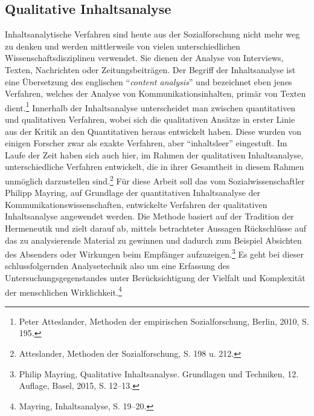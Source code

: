 \documentclass[
    a4paper,
    12pt,
    hyphens,
    chapterprefix=true,
    headheight=33pt,
    footheight=29pt,
    headings=optiontohead,
]{scrartcl}
\begin{document}
\subsection{Qualitative Inhaltsanalyse}
Inhaltsanalytische Verfahren sind heute aus der Sozialforschung nicht mehr weg zu denken und werden mittlerweile von vielen unterschiedlichen Wissenschaftsdisziplinen verwendet. Sie dienen der Analyse von Interviews, Texten, Nachrichten oder Zeitungsbeiträgen. Der Begriff der Inhaltsanalyse ist eine Übersetzung des englischen "`\textit{content analysis}"' und bezeichnet eben jenes Verfahren, welches der Analyse von Kommunikationsinhalten, primär von Texten dient.\footnote{Peter Atteslander, Methoden der empirischen Sozialforschung, Berlin, 2010, S. 195.} Innerhalb der Inhaltsanalyse unterscheidet man zwischen quantitativen und qualitativen Verfahren, wobei sich die qualitativen Ansätze in erster Linie aus der Kritik an den Quantitativen heraus entwickelt haben. Diese wurden von einigen Forscher zwar als exakte Verfahren, aber "`inhaltsleer"' eingestuft. Im Laufe der Zeit haben sich auch hier, im Rahmen der qualitativen Inhaltsanalyse, unterschiedliche Verfahren entwickelt, die in ihrer Gesamtheit in diesem Rahmen unmöglich darzustellen sind.\footnote{Atteslander, Methoden der Sozialforschung, S. 198 u. 212.} Für diese Arbeit soll das vom Sozialwissenschaftler Philipp Mayring, auf Grundlage der quantitativen Inhaltsanalyse der Kommunikationswissenschaften, entwickelte Verfahren der qualitativen Inhaltsanalyse angewendet werden. Die Methode basiert auf der Tradition der Hermeneutik und zielt darauf ab, mittels betrachteter Aussagen Rückschlüsse auf das zu analysierende Material zu gewinnen und dadurch zum Beispiel Absichten des Absenders oder Wirkungen beim Empfänger aufzuzeigen.\footnote{Philip Mayring, Qualitative Inhaltsanalyse. Grundlagen und Techniken, 12. Auflage, Basel, 2015, S. 12--13.} Es geht bei dieser schlussfolgernden Analysetechnik also um eine Erfassung des Untersuchungsgegenstandes unter Berücksichtigung der Vielfalt und Komplexität der menschlichen Wirklichkeit.\footnote{Mayring, Inhaltsanalyse, S. 19--20.}\\
\end{document}
